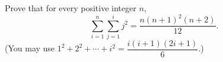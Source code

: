 Prove that for every positive integer $n$,
\[\sum_{i=1}^{n}\sum_{j=1}^{i}j^2=\dfrac{n(n+1)^2(n+2)}{12}.\]
(You may use $1^2+2^2+\cdots+i^2=\dfrac{i(i+1)(2i+1)}{6}$.)
